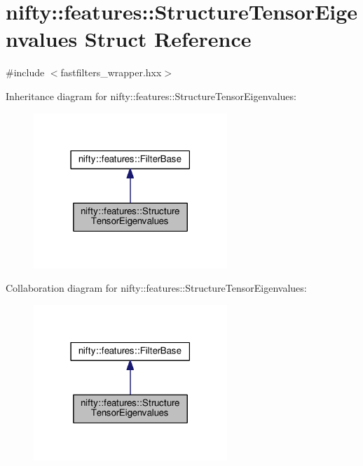\hypertarget{structnifty_1_1features_1_1StructureTensorEigenvalues}{}\section{nifty\+:\+:features\+:\+:Structure\+Tensor\+Eigenvalues Struct Reference}
\label{structnifty_1_1features_1_1StructureTensorEigenvalues}


{\ttfamily \#include $<$fastfilters\+\_\+wrapper.\+hxx$>$}



Inheritance diagram for nifty\+:\+:features\+:\+:Structure\+Tensor\+Eigenvalues\+:\nopagebreak
\begin{figure}[H]
\begin{center}
\leavevmode
\includegraphics[width=207pt]{structnifty_1_1features_1_1StructureTensorEigenvalues__inherit__graph}
\end{center}
\end{figure}


Collaboration diagram for nifty\+:\+:features\+:\+:Structure\+Tensor\+Eigenvalues\+:\nopagebreak
\begin{figure}[H]
\begin{center}
\leavevmode
\includegraphics[width=207pt]{structnifty_1_1features_1_1StructureTensorEigenvalues__coll__graph}
\end{center}
\end{figure}
